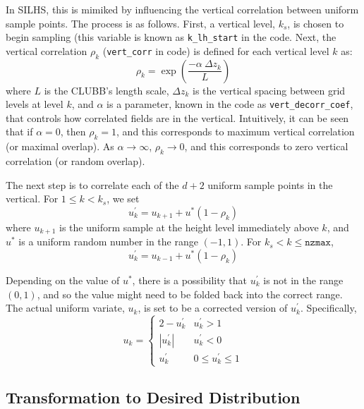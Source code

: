 \documentclass[11pt,fleqn]{article}
\begin{document}
In SILHS, this is mimiked by influencing the vertical correlation between
uniform sample points. The process is as follows. First, a vertical level,
$k_s$, is chosen to begin sampling (this variable is known as
\texttt{k\_lh\_start} in the code. Next, the vertical correlation $\rho_k$
(\texttt{vert\_corr} in code) is defined for each vertical level $k$ as:
\begin{equation}
\rho_k = \exp\left(\frac{-\alpha\ \Delta z_k}{L}\right)
\end{equation}
where $L$ is the CLUBB's length scale, $\Delta z_k$ is the vertical spacing
between grid levels at level $k$, and $\alpha$ is a parameter, known in the code
as \texttt{vert\_decorr\_coef}, that controls how correlated fields are in the
vertical. Intuitively, it can be seen that if $\alpha = 0$, then $\rho_k = 1$,
and this corresponds to maximum vertical correlation (or maximal overlap). As
$\alpha \rightarrow \infty$, $\rho_k \rightarrow 0$, and this corresponds to
zero vertical correlation (or random overlap).

The next step is to correlate each of the $d+2$ uniform sample points in the
vertical. For $1 \le k < k_s$, we set
\begin{equation}
u_{k}^{'} = u_{k+1} + u^* \left(1-\rho_k\right)
\end{equation}
where $u_{k+1}$ is the uniform sample at the height level immediately above $k$,
and $u^*$ is a uniform random number in the range $(-1,1)$. For $k_s < k \le
\texttt{nzmax}$,
\begin{equation}
u_{k}^{'} = u_{k-1} + u^* \left(1-\rho_k\right)
\end{equation}

Depending on the value of $u^*$, there is a possibility that $u_{k}^{'}$ is not
in the range $(0,1)$, and so the value might need to be folded back into the
correct range. The actual uniform variate, $u_k$, is set to be a corrected
version of $u_{k}^{'}$. Specifically,
\begin{equation}
u_k =
\begin{cases}
2 - u_{k}^{'} & u_{k}^{'} > 1 \\
| u_{k}^{'} | & u_{k}^{'} < 0 \\
u_{k}^{'} & 0 \le u_{k}^{'} \le 1
\end{cases}
\end{equation}

\subsection{Transformation to Desired Distribution}
\end{document}
